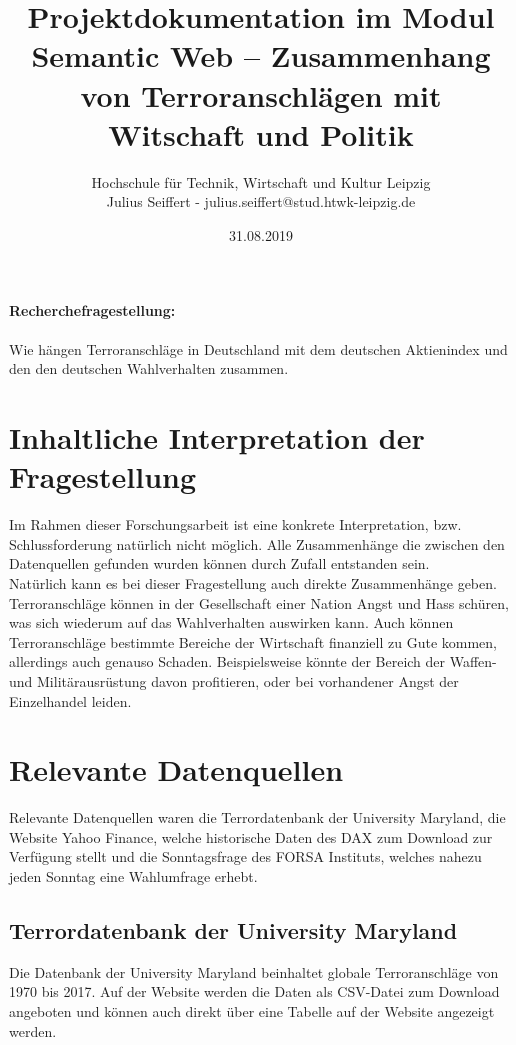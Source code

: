 \documentclass[a4paper,10pt,parskip]{article}
\title{Projektdokumentation im Modul Semantic Web -- Zusammenhang von Terroranschlägen mit Witschaft und Politik}
\author{Hochschule für Technik, Wirtschaft und Kultur Leipzig\\Julius Seiffert - julius.seiffert@stud.htwk-leipzig.de}
\date{31.08.2019}
\begin{document}
\maketitle


\paragraph{Recherchefragestellung: }
Wie hängen Terroranschläge in Deutschland mit dem deutschen Aktienindex und den den deutschen Wahlverhalten zusammen.


\section{Inhaltliche Interpretation der Fragestellung}

Im Rahmen dieser Forschungsarbeit ist eine konkrete Interpretation, bzw. Schlussforderung natürlich nicht möglich. Alle Zusammenhänge die zwischen den Datenquellen gefunden wurden können durch Zufall entstanden sein.\\
Natürlich kann es bei dieser Fragestellung auch direkte Zusammenhänge geben. Terroranschläge können in der Gesellschaft einer Nation Angst und Hass schüren, was sich wiederum auf das Wahlverhalten auswirken kann. Auch können Terroranschläge bestimmte Bereiche der Wirtschaft finanziell zu Gute kommen, allerdings auch genauso Schaden. Beispielsweise könnte der Bereich der Waffen- und Militärausrüstung davon profitieren, oder  bei vorhandener Angst der Einzelhandel leiden.



\section{Relevante Datenquellen}

Relevante Datenquellen waren die Terrordatenbank der University Maryland, die Website Yahoo Finance, welche historische Daten des DAX zum Download zur Verfügung stellt und die Sonntagsfrage des FORSA Instituts, welches nahezu jeden Sonntag eine Wahlumfrage erhebt.

\subsection{Terrordatenbank der University Maryland}

Die Datenbank der University Maryland beinhaltet globale Terroranschläge von 1970 bis 2017. Auf der Website werden die Daten als CSV-Datei zum Download angeboten und können auch direkt über eine Tabelle auf der Website angezeigt werden.
\end{document}
